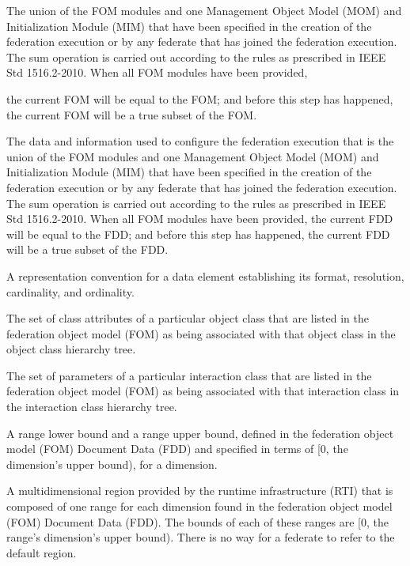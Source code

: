 The union of the FOM modules and one Management Object Model (MOM) and Initialization Module (MIM) that have been specified in the creation of the federation execution or by any federate that has joined the federation execution. The sum operation is carried out according to the rules as prescribed in IEEE Std 1516.2-2010. When all FOM modules have been provided,

\clearpage
the current FOM will be equal to the FOM; and before this step has happened, the current FOM will be a true subset of the FOM.

 The data and information used to configure the federation execution that is the union of the FOM modules and one Management Object Model (MOM) and Initialization Module (MIM) that have been specified in the creation of the federation execution or by any federate that has joined the federation execution. The sum operation is carried out according to the rules as prescribed in IEEE Std 1516.2-2010. When all FOM modules have been provided, the current FDD will be equal to the FDD; and before this step has happened, the current FDD will be a true subset of the FDD.

 A representation convention for a data element establishing its format, resolution, cardinality, and ordinality.

 The set of class attributes of a particular object class that are listed in the federation object model (FOM) as being associated with that object class in the object class hierarchy tree.

 The set of parameters of a particular interaction class that are listed in the federation object model (FOM) as being associated with that interaction class in the interaction class hierarchy tree.

 A range lower bound and a range upper bound, defined in the federation object model (FOM) Document Data (FDD) and specified in terms of [0, the dimension's upper bound), for a dimension.

 A multidimensional region provided by the runtime infrastructure (RTI) that is composed of one range for each dimension found in the federation object model (FOM) Document Data (FDD). The bounds of each of these ranges are [0, the range's dimension's upper bound). There is no way for a federate to refer to the default region.

